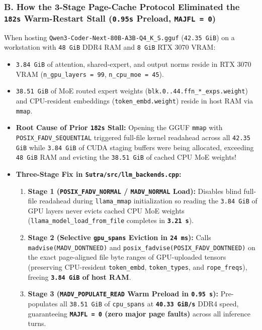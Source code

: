 \documentclass[11pt,a4paper]{article}
\begin{document}
\subsubsection{B. How the 3-Stage Page-Cache Protocol Eliminated the \texttt{182s} Warm-Restart Stall (\texttt{0.95s} Preload, \texttt{MAJFL = 0})}
When hosting \texttt{Qwen3-Coder-Next-80B-A3B-Q4\_K\_S.gguf} (\texttt{42.35 GiB}) on a workstation with \texttt{48 GiB} DDR4 RAM and \texttt{8 GiB} RTX 3070 VRAM:
\begin{itemize}[leftmargin=1.5em]
  \item \texttt{3.84 GiB} of attention, shared-expert, and output norms reside in RTX 3070 VRAM (\texttt{n\_gpu\_layers = 99}, \texttt{n\_cpu\_moe = 45}).
  \item \texttt{38.51 GiB} of MoE routed expert weights (\texttt{blk.0..44.ffn\_*\_exps.weight}) and CPU-resident embeddings (\texttt{token\_embd.weight}) reside in host RAM via \texttt{mmap}.
  \item \textbf{Root Cause of Prior \texttt{182s} Stall:} Opening the GGUF \texttt{mmap} with \texttt{POSIX\_FADV\_SEQUENTIAL} triggered full-file kernel readahead across all \texttt{42.35 GiB} while \texttt{3.84 GiB} of CUDA staging buffers were being allocated, exceeding \texttt{48 GiB} RAM and evicting the \texttt{38.51 GiB} of cached CPU MoE weights!
  \item \textbf{Three-Stage Fix in \texttt{Sutra/src/llm\_backends.cpp}:}
  \begin{enumerate}
    \item \textbf{Stage 1 (\texttt{POSIX\_FADV\_NORMAL} / \texttt{MADV\_NORMAL} Load):} Disables blind full-file readahead during \texttt{llama\_mmap} initialization so reading the \texttt{3.84 GiB} of GPU layers never evicts cached CPU MoE weights (\texttt{llama\_model\_load\_from\_file} completes in \textbf{\texttt{3.21 s}}).
    \item \textbf{Stage 2 (Selective \texttt{gpu\_spans} Eviction in \texttt{24 ms}):} Calls \texttt{madvise(MADV\_DONTNEED)} and \texttt{posix\_fadvise(POSIX\_FADV\_DONTNEED)} on the exact page-aligned file byte ranges of GPU-uploaded tensors (preserving CPU-resident \texttt{token\_embd}, \texttt{token\_types}, and \texttt{rope\_freqs}), freeing \textbf{\texttt{3.84 GiB} of host RAM}.
    \item \textbf{Stage 3 (\texttt{MADV\_POPULATE\_READ} Warm Preload in \texttt{0.95 s}):} Pre-populates all \texttt{38.51 GiB} of \texttt{cpu\_spans} at \textbf{\texttt{40.33 GiB/s}} DDR4 speed, guaranteeing \textbf{\texttt{MAJFL = 0} (zero major page faults)} across all inference turns.
  \end{enumerate}
\end{itemize}
\end{document}
